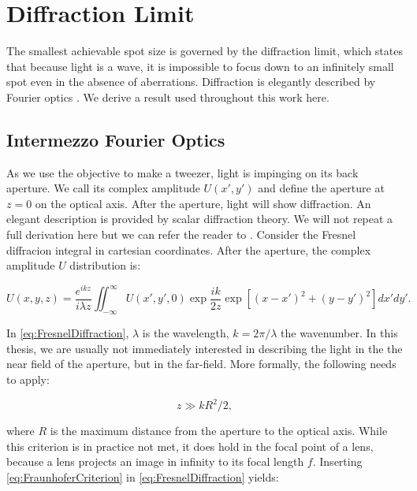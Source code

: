 \section{Diffraction Limit}

The smallest achievable spot size is governed by the diffraction limit, which states that because light is a wave, it is impossible to focus down to an infinitely small spot even in the absence of aberrations.
Diffraction is elegantly described by Fourier optics \cite{Goodman2005}. 
We derive a result used throughout this work here.

\begin{mdframed}
    \subsection*{Intermezzo Fourier Optics}
    
    As we use the objective to make a tweezer, light is impinging on its back aperture. 
    We call its complex amplitude $U(x',y')$ and define the aperture at $z = 0$ on the optical axis.
    After the aperture, light will show diffraction. 
    An elegant description is provided by scalar diffraction theory.
    We will not repeat a full derivation here but we can refer the reader to \cite{Goodman2005}.
    Consider the Fresnel diffracion integral in cartesian coordinates. 
    After the aperture, the complex amplitude $U$ distribution is:
    
    \begin{equation}\label{eq:FresnelDiffraction}
        U(x,y,z) = 
        \frac{e^{ikz}}{i \lambda z} \iint_{-\infty}^{\infty} U(x',y',0) \exp{\frac{ik}{2z}} \exp{\left[(x-x')^2+(y-y')^2\right]} dx'dy'.
    \end{equation}
    
    In \cref{eq:FresnelDiffraction}, $\lambda$ is the wavelength, $k=2\pi/\lambda$ the wavenumber.
    In this thesis, we are usually not immediately interested in describing the light in the the near field of the aperture, but in the far-field. 
    More formally, the following needs to apply:
    
    \begin{equation}\label{eq:FraunhoferCriterion}
        z \gg k R^2/2,
    \end{equation}
    
    where $R$ is the maximum distance from the aperture to the optical axis. 
    While this criterion is in practice not met, it does hold in the focal point of a lens, because a lens projects an image in infinity to its focal length $f$. 
    Inserting \cref{eq:FraunhoferCriterion} in \cref{eq:FresnelDiffraction} yields:
    

\end{mdframed}
